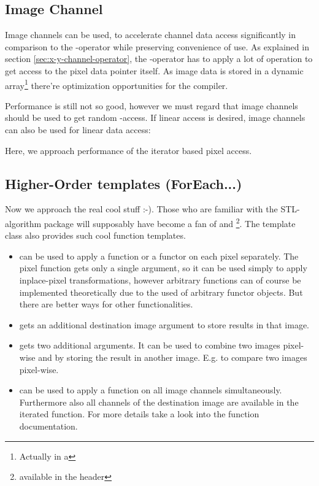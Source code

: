 \subsection{Image Channel}
Image channels can be used, to accelerate channel data access significantly in comparison to the -operator while preserving convenience of use. As explained in section \ref{sec:x-y-channel-operator}, the -operator has to apply a lot of operation to get access to the pixel data pointer itself. As image data is stored in a dynamic array\footnote{Actually in a } there're optimization opportunities for the compiler.


Performance is still not so good, however we must regard that image channels should be used to get random -access. If linear access is desired, image channels can also be used for linear data access:


Here, we approach performance of the iterator based pixel access.



\subsection{Higher-Order templates (ForEach...)}
                                   
Now we approach the real cool stuff :-). Those who are familiar with the STL-algorithm package will supposably have become a fan of  and \footnote{available in the  header}. The  template class also provides such cool function templates. 
\begin{itemize}
\item {} can be used to apply a function or a functor on each pixel separately. The pixel function gets only a single argument, so it can be used simply to apply inplace-pixel transformations, however arbitrary functions can of course be implemented theoretically due to the used of arbitrary functor objects. But there are better ways for other functionalities.
 
\item {} gets an additional destination image argument to store results in that image.

\item {} gets two additional arguments. It can be used to combine two images pixel-wise and by storing the result in another image. E.g. to compare two images pixel-wise.
\item {} can be used to apply a function on all image channels simultaneously. Furthermore also all channels of the destination image are available in the iterated function. For more details take a look into the function documentation.
\end{itemize}

